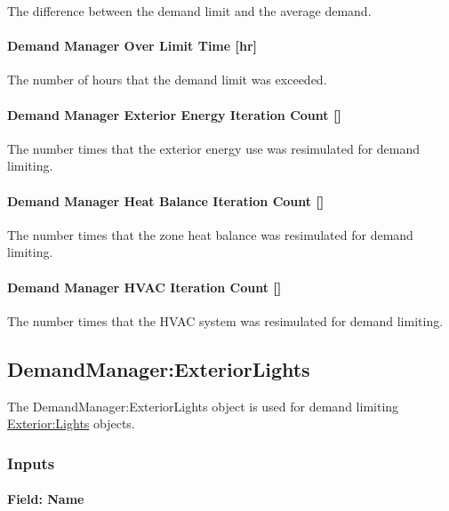 The difference between the demand limit and the average demand.

\paragraph{Demand Manager Over Limit Time {[}hr{]}}\label{demand-manager-over-limit-time-hr}

The number of hours that the demand limit was exceeded.

\paragraph{Demand Manager Exterior Energy Iteration Count {[]}}\label{demand-manager-exterior-energy-iteration-count}

The number times that the exterior energy use was resimulated for demand limiting.

\paragraph{Demand Manager Heat Balance Iteration Count {[]}}\label{demand-manager-heat-balance-iteration-count}

The number times that the zone heat balance was resimulated for demand limiting.

\paragraph{Demand Manager HVAC Iteration Count {[]}}\label{demand-manager-hvac-iteration-count}

The number times that the HVAC system was resimulated for demand limiting.

\subsection{DemandManager:ExteriorLights}\label{demandmanagerexteriorlights}

The DemandManager:ExteriorLights object is used for demand limiting \hyperref[exteriorlights]{Exterior:Lights} objects.

\subsubsection{Inputs}\label{inputs-1-009}

\paragraph{Field: Name}\label{field-name-1-008}

